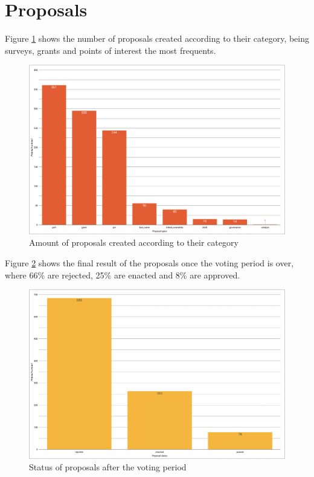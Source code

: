 \documentclass[MSE,Master,english]{twbook}%
\begin{document}
\section{Proposals}
Figure \ref{fig:proposal_types} shows the number of proposals created according to their category, being surveys, grants and points of interest the most frequents.
\begin{figure}[H]
  \centering
  \includegraphics[width=\textwidth]{metrics/proposal_types.png}
  \caption{Amount of proposals created according to their category}
  \label{fig:proposal_types}
\end{figure}

Figure \ref{fig:proposal_status} shows the final result of the proposals once the voting period is over, where 66\% are rejected, 25\% are enacted and 8\% are approved.
\begin{figure}[H]
  \centering
  \includegraphics[width=\textwidth]{metrics/proposal_status.png}
  \caption{Status of proposals after the voting period}
  \label{fig:proposal_status}
\end{figure}
\end{document}
